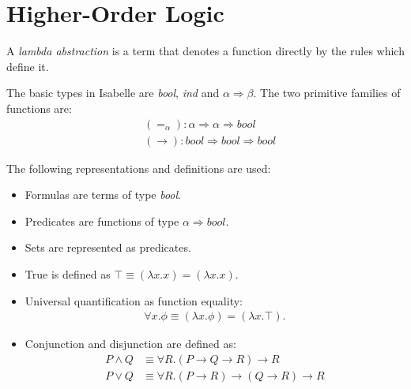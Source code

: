 \documentclass{article}
\begin{document}
\section{Higher-Order Logic}

\begin{definition}
    A \emph{lambda abstraction} is a term that denotes a function directly by the
    rules which define it.
\end{definition}

\begin{definition}
    The basic types in Isabelle are \emph{bool}, \emph{ind} and $\alpha\Rightarrow\beta$.
    The two primitive families of functions are:
    \begin{align*}
         & (=_\alpha): \alpha\Rightarrow \alpha \Rightarrow \textit{bool}                \\
         & (\rightarrow): \textit{bool} \Rightarrow\textit{bool}\Rightarrow\textit{bool}
    \end{align*}
\end{definition}

\begin{definition}
    The following representations and definitions are used:
    \begin{itemize}
        \item Formulas are terms of type \textit{bool}.
        \item Predicates are functions of type $\alpha\Rightarrow\textit{bool}$.
        \item Sets are represented as predicates.
        \item True is defined as $\top \equiv (\lambda x.x)=(\lambda x.x)$.
        \item Universal quantification as function equality: \begin{align*}
                  \forall x. \phi \equiv (\lambda x. \phi) = (\lambda x. \top).
              \end{align*}
        \item Conjunction and disjunction are defined as: \begin{align*}
                  P\wedge Q & \equiv \forall R. (P\rightarrow Q \rightarrow R) \rightarrow R               \\
                  P\vee Q   & \equiv \forall R. (P\rightarrow R)\rightarrow (Q\rightarrow R) \rightarrow R
              \end{align*}
    \end{itemize}
\end{definition}
\end{document}
